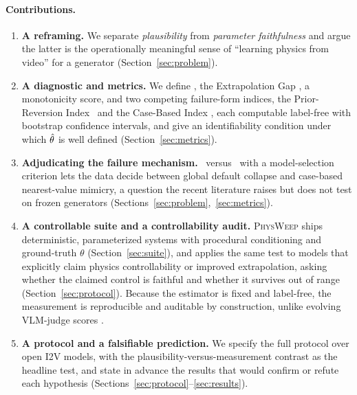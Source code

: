\paragraph{Contributions.}
\begin{enumerate}[leftmargin=1.4em,itemsep=2pt,topsep=2pt]
  \item \textbf{A reframing.} We separate \emph{plausibility} from
  \emph{parameter faithfulness} and argue the latter is the operationally
  meaningful sense of ``learning physics from video'' for a generator
  (Section~\ref{sec:problem}).
  \item \textbf{A diagnostic and metrics.} We define \PRE, the Extrapolation
  Gap \EG, a monotonicity score, and two competing failure-form indices, the
  Prior-Reversion Index \PRI\ and the Case-Based Index \CBI, each computable
  label-free with bootstrap confidence intervals, and give an identifiability
  condition under which $\hat{\theta}$ is well defined (Section~\ref{sec:metrics}).
  \item \textbf{Adjudicating the failure mechanism.} \PRI\ versus \CBI\ with a
  model-selection criterion lets the data decide between global default
  collapse and case-based nearest-value mimicry, a question the recent
  literature raises but does not test on frozen generators
  (Sections~\ref{sec:problem},~\ref{sec:metrics}).
  \item \textbf{A controllable suite and a controllability audit.}
  \textsc{PhysWeep} ships deterministic, parameterized systems with procedural
  conditioning and ground-truth $\theta$ (Section~\ref{sec:suite}), and applies
  the same test to models that explicitly claim physics controllability or
  improved extrapolation, asking whether the claimed control is faithful and
  whether it survives out of range (Section~\ref{sec:protocol}). Because the
  estimator is fixed and label-free, the measurement is reproducible and
  auditable by construction, unlike evolving VLM-judge scores
  \citep{phyground2026}.
  \item \textbf{A protocol and a falsifiable prediction.} We specify the full
  protocol over open I2V models, with the plausibility-versus-measurement
  contrast as the headline test, and state in advance the results that would
  confirm or refute each hypothesis (Sections~\ref{sec:protocol}--\ref{sec:results}).
\end{enumerate}

